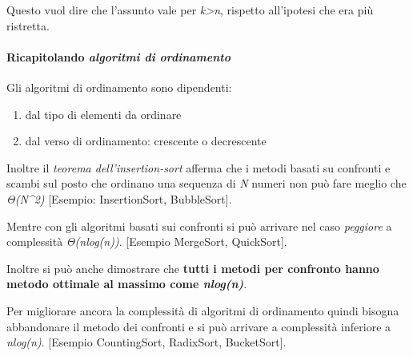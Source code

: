 \documentclass[
]{article}
\begin{document}
Questo vuol dire che l'assunto vale per \emph{k\textgreater n}, rispetto
all'ipotesi che era più ristretta.

\hypertarget{header-n1791}{%
\paragraph{\texorpdfstring{Ricapitolando \emph{algoritmi di ordinamento}
}{Ricapitolando algoritmi di ordinamento }}\label{header-n1791}}

Gli algoritmi di ordinamento sono dipendenti:

\begin{enumerate}
\def\labelenumi{\arabic{enumi}.}
\item
  dal tipo di elementi da ordinare
\item
  dal verso di ordinamento: crescente o decrescente
\end{enumerate}

Inoltre il \emph{teorema dell'insertion-sort} afferma che i metodi
basati su confronti e scambi sul posto che ordinano una sequenza di
\emph{N} numeri non può fare meglio che \emph{Θ(N\^{}2)} {[}Esempio:
InsertionSort, BubbleSort{]}.

Mentre con gli algoritmi basati sui confronti si può arrivare nel caso
\emph{peggiore} a complessità \emph{Θ(nlog(n))}. {[}Esempio MergeSort,
QuickSort{]}.

Inoltre si può anche dimostrare che \textbf{tutti i metodi per confronto
hanno metodo ottimale al massimo come \emph{nlog(n)}}.

Per migliorare ancora la complessità di algoritmi di ordinamento quindi
bisogna abbandonare il metodo dei confronti e si può arrivare a
complessità inferiore a \emph{nlog(n)}. {[}Esempio CountingSort,
RadixSort, BucketSort{]}.
\end{document}
